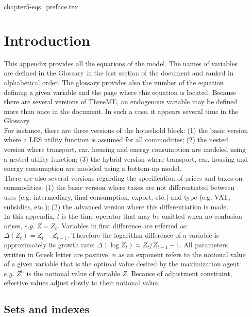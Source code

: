 \documentclass[12pt]{article}
\numberwithin{equation}{section}
\begin{document}
  {chapter5-eqs_preface.tex}
  \fi
  


\section{Introduction}



This appendix provides all the equations of the model. The names of variables are defined in the Glossary in the last section of the document and ranked in alphabetical order. The glossary provides also the number of the equation defining a given variable and the page where this equation is located. Because there are several versions of ThreeME, an endogenous variable may be defined more than once in the document. In such a case, it appears several time in the Glossary. \\

For instance, there are three versions of the household block: (1) the basic version where a LES utility function is assumed for all commodities; (2) the nested version where transport, car, housing and energy consumption are modeled using a nested utility function; (3) the hybrid version where transport, car, housing and energy consumption are modeled using a bottom-up model. \\

There are also several versions regarding the specification of prices and taxes on commodities: (1) the basic version where taxes are not differentiated between uses (e.g. intermediary, final consumption, export, etc.) and type (e.g. VAT, subsidies, etc.); (2) the advanced version where this differentiation is made. \\

In this appendix, $t$ is the time operator that may be omitted when no confusion arises, $e.g.$ $Z = Z_{t}$. Variables in first difference are referred as: $\varDelta\left(Z_{t}\right) = Z_{t}-Z_{t-1}$. Therefore the logarithm difference of a variable is approximately its growth rate: $\varDelta\left(\operatorname{log} Z_{t}\right) \approx Z_{t}/Z_{t-1}-1$. All parameters written in Greek letter are positive. $n$ as an exponent refers to the notional value of a given variable that is the optimal value desired by the maximization agent: $e.g.$ $Z^{n}$ is the notional value of variable $Z$. Because of adjustment constraint, effective values adjust slowly to their notional value.



\subsection{Sets and indexes}
\end{document}
